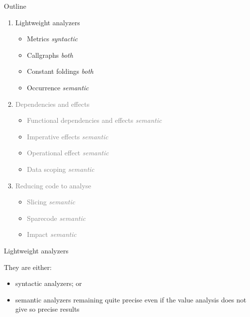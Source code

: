 \documentclass{beamer}
\newcommand{\vvert}[1]{{\textcolor{vert}{#1}}}
\newcommand{\gris}[1]{{\textcolor{gray}{#1}}}
\begin{document}
\begin{frame}{Outline}
\begin{enumerate}
\item \vvert{Lightweight analyzers}
  \begin{itemize}
  \item Metrics           \hfill \emph{syntactic}
  \item Callgraphs        \hfill \emph{both}
  \item Constant foldings \hfill \emph{both}
  \item Occurrence        \hfill \emph{semantic}
  \end{itemize}\medskip
%
\item \gris{Dependencies and effects}
  \begin{itemize}
  \item \gris{Functional dependencies and effects  \hfill \emph{semantic}}
  \item \gris{Imperative effects       \hfill \emph{semantic}}
  \item \gris{Operational effect       \hfill \emph{semantic}}
  \item \gris{Data scoping             \hfill \emph{semantic}}
  \end{itemize}\medskip
%
\item \gris{Reducing code to analyse}
  \begin{itemize}
  \item \gris{Slicing   \hfill \emph{semantic}}
  \item \gris{Sparecode \hfill \emph{semantic}}
  \item \gris{Impact    \hfill \emph{semantic}}
  \end{itemize}
\end{enumerate}
\end{frame}


\begin{frame}{Lightweight analyzers}

  They are either:
  \begin{itemize}
  \item \vvert{syntactic analyzers}; or
  \item \vvert{semantic analyzers remaining quite precise} even if the value
    analysis does not give so precise results
  \end{itemize}

\end{frame}
\end{document}
